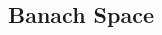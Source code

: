 \documentclass[12pt,oneside]{book} %
\begin{document}
\begin{spacing}{1}



\part{Banach Space}




% 

% 

% 

% 




\end{spacing}
\end{document}
